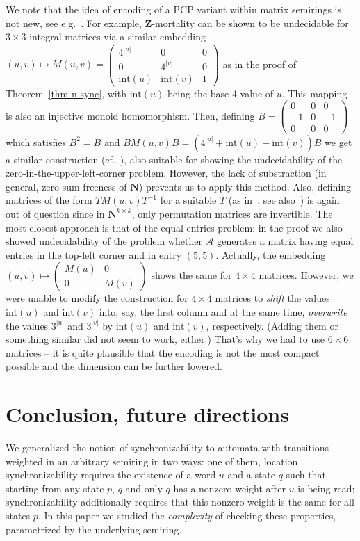 \documentclass[submission,copyright,creativecommons]{eptcs}
\def\bN{{\mathbf{N}}}
\theoremstyle{plain}
\theoremstyle{definition}
\theoremstyle{remark}
\begin{document}
We note that the idea of encoding of a PCP variant within matrix semirings is not new, see e.g.~\cite{halavahirvensalo,potapov,gaubert}.
For example, $\mathbf{Z}$-mortality can be shown to be undecidable for $3\times 3$ integral matrices
via a similar embedding $(u,v)\mapsto M(u,v)=\left(\begin{array}{lll}4^{|u|}&0&0\\0&4^{|v|}&0\\\mathrm{int}(u)&\mathrm{int}(v)&1\end{array}\right)$ as in 
the proof of Theorem~\ref{thm-n-sync}, with $\mathrm{int}(u)$ being the base-4 value of $u$. This mapping is also an injective monoid
homomorphism. Then, defining $B=\left(\begin{array}{lll}0&0&0\\-1&0&-1\\0&0&0\end{array}\right)$ which satisfies
$B^2=B$ and $BM(u,v)B=(4^{|u|}+\mathrm{int}(u)-\mathrm{int}(v))B$ we get a similar construction (cf.~\cite{Halava97decidableand}),
also suitable for showing the undecidability of the zero-in-the-upper-left-corner problem.
However, the lack of substraction (in general, zero-sum-freeness of $\bN$) prevents us to apply this method.
Also, defining matrices of the form $TM(u,v)T^{-1}$ for a suitable $T$ (as in~\cite{Halava01mortalityin}, see also~\cite{paterson}) is again out of question
since in $\bN^{k\times k}$, only permutation matrices are invertible.
The most closest approach is that of the equal entries problem: in the proof we also showed undecidability of the
problem whether $\mathcal{A}$ generates a matrix having equal entries in the top-left corner and in entry $(5,5)$.
Actually, the embedding $(u,v)\mapsto\left(\begin{array}{ll}M(u)&0\\0&M(v)\end{array}\right)$ shows the same for $4\times 4$ matrices.
However, we were unable to modify the construction for $4\times 4$ matrices to \emph{shift} the values $\mathrm{int}(u)$ and
$\mathrm{int}(v)$ into, say, the first column and at the same time, \emph{overwrite} the values $3^{|u|}$ and $3^{|v|}$
by $\mathrm{int}(u)$ and $\mathrm{int}(v)$, respectively. (Adding them or something similar did not seem to work, either.)
That's why we had to use $6\times 6$ matrices -- it is quite plausible that the encoding is not the most compact possible
and the dimension can be further lowered.


\section{Conclusion, future directions}
We generalized the notion of synchronizability to automata with transitions weighted in an arbitrary semiring in two ways:
one of them, location synchronizability requires the existence of a word $u$ and a state $q$ such that starting from any state $p$,
$q$ and only $q$ has a nonzero weight after $u$ is being read; synchronizability additionally requires that this nonzero weight
is the same for all states $p$. In this paper we studied the \emph{complexity} of checking these properties, parametrized by the underlying
semiring.
\end{document}
